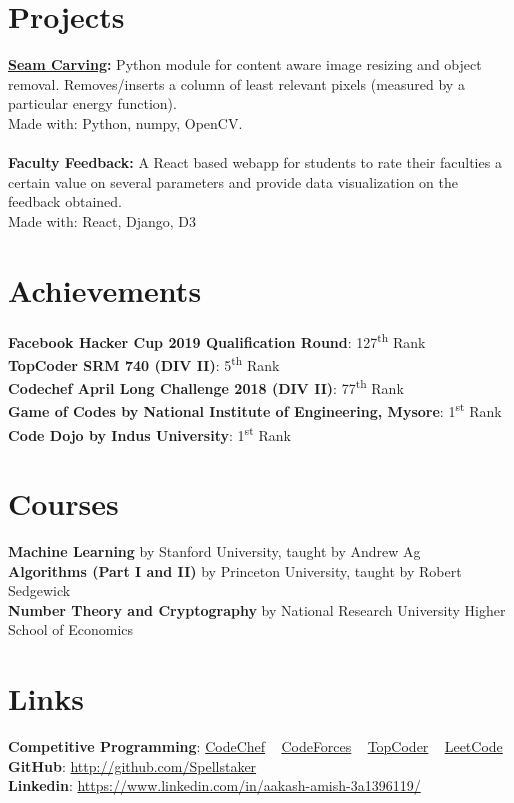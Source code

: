 \documentclass[margin, centered]{res}
\begin{document}
\begin{resume}
		\section{Projects}
			\textbf{\href{https://github.com/Spellstaker/Seam-Carving}{Seam Carving}:}
			Python module for content aware image resizing and object removal.
			Removes/inserts a column of least relevant pixels (measured by a particular energy function).\\
			Made with: Python, numpy, OpenCV.
			\\ \\
			\textbf{Faculty Feedback:}
			A React based webapp for students to rate their faculties a certain value on several parameters
			and provide data visualization on the feedback obtained.\\
			Made with: React, Django, D3
		
		\section{Achievements}
			\textbf{Facebook Hacker Cup 2019 Qualification Round}: 127\textsuperscript{th} Rank\\
			\textbf{TopCoder SRM 740 (DIV II)}: 5\textsuperscript{th} Rank\\
			\textbf{Codechef April Long Challenge 2018 (DIV II)}: 77\textsuperscript{th} Rank\\
			\textbf{Game of Codes by National Institute of Engineering, Mysore}: 1\textsuperscript{st} Rank\\
			\textbf{Code Dojo by Indus University}: 1\textsuperscript{st} Rank
		
		\section{Courses}
			\textbf{Machine Learning} by Stanford University, taught by Andrew Ag\\
			\textbf{Algorithms (Part I and II)} by Princeton University, taught by Robert Sedgewick\\
			\textbf{Number Theory and Cryptography} by National Research University Higher School of Economics 
		
		\section{Links}
			\textbf{Competitive Programming}:
			\href{https://www.codechef.com/users/spellstaker}{CodeChef}
			~
			\href{https://codeforces.com/profile/spellstaker}{CodeForces}
			~
			\href{https://topcoder.com/members/spellstaker/}{TopCoder}
			~
			\href{https://leetcode.com/spellstaker/}{LeetCode}
			\\
			\textbf{GitHub}: \href{https://github.com/Spellstaker}{http://github.com/Spellstaker}
			\\
			\textbf{Linkedin}: \href{https://www.linkedin.com/in/aakash-amish-3a1396119/}{https://www.linkedin.com/in/aakash-amish-3a1396119/}
	\end{resume}
\end{document}
